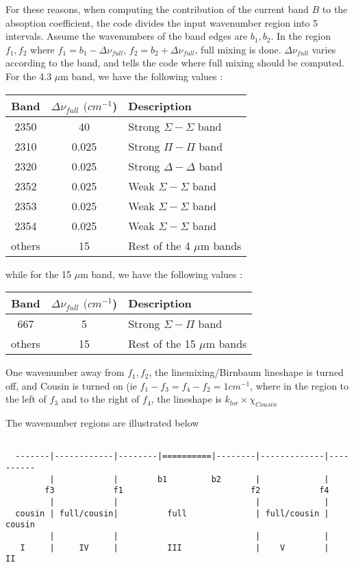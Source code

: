 \documentclass[11pt]{article}
\begin{document}
For these reasons, when computing the contribution of the current band $B$ to 
the absoption coefficient, the code divides the input wavenumber region into 
5 intervals. Assume the wavenumbers of the band edges are $b_{1},b_{2}$. 
In the region $f_{1},f_{2}$ where $f_{1} = b_{1} - \Delta \nu_{full}$,
$f_{2} = b_{2} + \Delta \nu_{full} $, full mixing is done. $\Delta \nu_{full}$
varies according to the band, and tells the code where full mixing should
be computed. For the 4.3 $\mu$m band, we have the following values :
\begin{longtable}{ccl}
\hline
\hline
Band & $\Delta \nu_{full}$ $(cm^{-1}$) & Description \\
\hline
\hline
2350 &    40            &Strong $\Sigma-\Sigma$ band \\
2310 &    0.025         &Strong $\Pi-\Pi$ band \\
2320 &    0.025         &Strong $\Delta-\Delta$ band \\
2352 &    0.025         &Weak $\Sigma-\Sigma$ band \\
2353 &    0.025         &Weak $\Sigma-\Sigma$ band \\
2354 &    0.025         &Weak $\Sigma-\Sigma$ band \\
others &  15            &Rest of the 4 $\mu$m bands\\
\hline
\hline
\end{longtable}

while for the 15 $\mu$m band, we have the following values :
\begin{longtable}{ccl}
\hline
\hline
Band & $\Delta \nu_{full}$ $(cm^{-1}$) & Description \\
\hline
\hline
667     & 5              & Strong $\Sigma-\Pi$ band \\
others  & 15             & Rest of the 15 $\mu$m bands\\
\hline
\hline
\end{longtable}

One wavenumber away from $f_{1},f_{2}$, the linemixing/Birnbaum lineshape is 
turned off, and Cousin is turned on (ie $f_{1}-f_{3}=f_{4}-f_{2} = 1 cm^{-1}$,
where in the region to the left of $f_{3}$ and to the right of $f_{4}$, the 
lineshape is $k_{lor} \times \chi_{Cousin}$

The wavenumber regions are illustrated below

\begin{verbatim}

  -------|------------|--------|==========|--------|-------------|----------
         |            |        b1         b2       |             |
        f3            f1                          f2            f4
         |            |                            |             | 
  cousin | full/cousin|          full              | full/cousin |  cousin    
         |            |                            |             | 
   I     |     IV     |          III               |    V        |    II

\end{verbatim}
\end{document}
